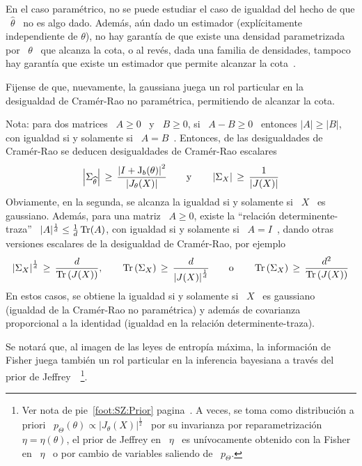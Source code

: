 %
\noindent En el caso param\'etrico, no se puede estudiar el caso de igualdad del
hecho de  que \ $\widehat{\theta}$ \ no  es algo dado.  Adem\'as,  a\'un dado un
estimador (expl\'icitamente independiente de $\theta$), no hay garant\'ia de que
existe una  densidad parametrizada por  \ $\theta$ \  que alcanza la cota,  o al
rev\'es, dada  una familia de densidades,  tampoco hay garant\'ia  que existe un
estimador que permite alcanzar la cota~\cite{CovTho06, Kay93, Bos07}.

Fijense  de  que,  nuevamente,  la  gaussiana  juega un  rol  particular  en  la
desigualdad de Cram\'er-Rao no param\'etrica, permitiendo de alcanzar la cota.

Nota: para  dos matrices \  $A \ge 0$  \ y \  $B \ge 0$,  si \ $A  - B \ge  0$ \
entonces $|A| \ge  |B|$, con igualdad si y solamente si  \ $A = B$~\cite[cap.~1,
teorema~25]{MagNeu99}.   Entonces,  de  las  desigualdades  de  Cram\'er-Rao  se
deducen desigualdades de Cram\'er-Rao escalares
%
\[
\left|   \Sigma_{\widehat{\theta}}  \right|   \,   \ge  \,   \frac{\left|  I   +
    \operatorname{J}_b(\theta) \right|^2}{\left| J_\theta(X) \right|} \qquad \mbox{y} \qquad
\left| \Sigma_X \right| \, \ge \, \frac{1}{\left| J(X) \right|}
\]
%
Obviamente, en la segunda,  se alcanza la igualdad si y solamente  si \ $X$ \ es
gaussiano.   Adem\'as, para  una  matriz \  $A  \ge 0$,  existe la  ``relaci\'on
determinente-traza''  \ $|A|^{\frac1d} \le  \frac1d \operatorname{Tr}(A)$,  con igualdad  si y
solamente si  \ $A = I$~\cite[cap.~11, sec.~4]{MagNeu99},  dando otras versiones
escalares de la desigualdad de Cram\'er-Rao, por ejemplo
%
\[
\left| \Sigma_X  \right|^{\frac1d} \,  \ge \, \frac{d}{\operatorname{Tr}\left(  J(X) \right)},
\qquad   \operatorname{Tr}\left(   \Sigma_X   \right)   \,   \ge   \,   \frac{d}{\left|   J(X)
  \right|^{\frac1d}} \qquad \mbox{o} \qquad \operatorname{Tr}\left( \Sigma_X \right) \, \ge \,
\frac{d^2}{\operatorname{Tr}\left( J(X) \right)}
\]
%
En estos casos,  se obtiene la igualdad si  y solamente si \ $X$  \ es gaussiano
(igualdad  de  la  Cram\'er-Rao  no  param\'etrica)  y  adem\'as  de  covarianza
proporcional a la identidad (igualdad en la relaci\'on determinente-traza).

Se notar\'a que, al imagen de las leyes de entrop\'ia m\'axima, la informaci\'on
de  Fisher  juega tambi\'en  un  rol particular  en  la  inferencia bayesiana  a
trav\'es del prior de Jeffrey~\cite{Jef46, Jef48, LehCas98, Rob07}~\footnote{Ver
  nota de  pie~\ref{foot:SZ:Prior} pagina~\pageref{foot:SZ:Prior}.  A  veces, se
  toma    como   distribuci\'on   a    priori   \    $p_\Theta(\theta)   \propto
  |J_\theta(X)|^\frac12$ \  por su invarianza por reparametrizaci\'on  \ $\eta =
  \eta(\theta)$,  \ie  el prior  de  Jeffrey en  \  $\eta$  \ es  un\'ivocamente
  obtenido con la Fisher  en \ $\eta$ \ o por cambio  de variables saliendo de \
  $p_\Theta$.}.


